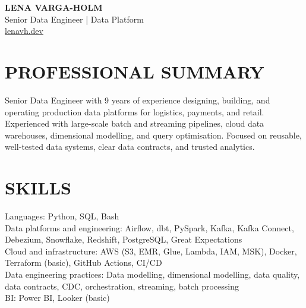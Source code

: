 \documentclass[11pt,a4paper]{article}
\begin{document}
\begin{center}
{\Huge\bfseries\color{primarycolor} LENA VARGA-HOLM}\\[0.25em]
{\large\color{accentcolor} Senior Data Engineer | Data Platform}\\
\href{https://lenavh.dev}{lenavh.dev}
\end{center}

\section*{PROFESSIONAL SUMMARY}
Senior Data Engineer with 9 years of experience designing, building, and operating production data platforms for logistics, payments, and retail. Experienced with large-scale batch and streaming pipelines, cloud data warehouses, dimensional modelling, and query optimisation. Focused on reusable, well-tested data systems, clear data contracts, and trusted analytics.

\section*{SKILLS}
Languages: Python, SQL, Bash\\
Data platforms and engineering: Airflow, dbt, PySpark, Kafka, Kafka Connect, Debezium, Snowflake, Redshift, PostgreSQL, Great Expectations\\
Cloud and infrastructure: AWS (S3, EMR, Glue, Lambda, IAM, MSK), Docker, Terraform (basic), GitHub Actions, CI/CD\\
Data engineering practices: Data modelling, dimensional modelling, data quality, data contracts, CDC, orchestration, streaming, batch processing\\
BI: Power BI, Looker (basic)
\end{document}
